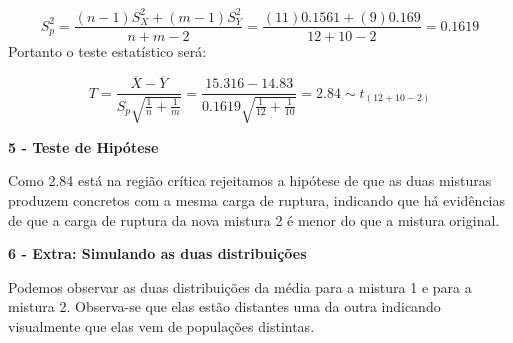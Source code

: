 \documentclass[
  letterpaper,
  DIV=11,
  numbers=noendperiod]{scrartcl}
\begin{document}
\[S_p^2=\frac{(n-1)S_X^2+(m-1)S_Y^2}{n+m-2}=\frac{(11)0.1561+(9)0.169}{12+10-2}= 0.1619\]
Portanto o teste estatístico será:

\[T=\frac{\overline{X}-\overline{Y}}{S_p\sqrt{\frac{1}{n}+\frac{1}{m}}}=\frac{15.316-14.83}{0.1619\sqrt{\frac{1}{12}+\frac{1}{10}}}= 2.84\sim t_{(12+10-2)}\]

\vspace{0.5cm}

\textbf{5 - Teste de Hipótese}

Como 2.84 está na região crítica rejeitamos a hipótese de que as duas
misturas produzem concretos com a mesma carga de ruptura, indicando que
há evidências de que a carga de ruptura da nova mistura 2 é menor do que
a mistura original.

\vspace{0.5cm}

\textbf{6 - Extra: Simulando as duas distribuições}

Podemos observar as duas distribuições da média para a mistura 1 e para
a mistura 2. Observa-se que elas estão distantes uma da outra indicando
visualmente que elas vem de populações distintas.

\vspace{0.5cm}
\end{document}

